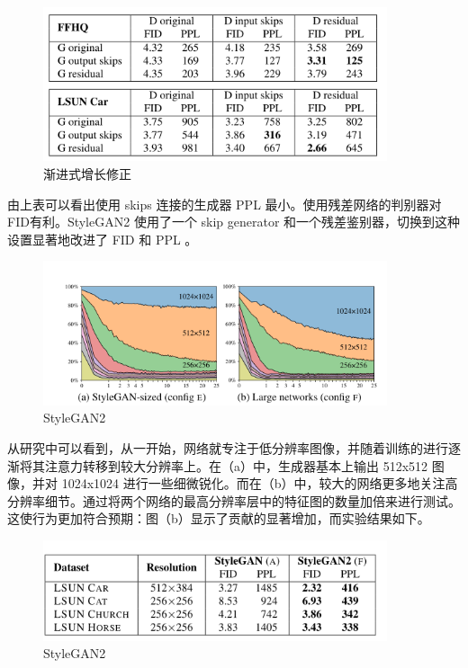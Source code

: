 \begin{figure}[htb]
\centering 
\includegraphics[width=0.9\textwidth]{img/m2t17.png} 
\caption{渐进式增长修正}
\label{Test}
\end{figure}

由上表可以看出使用 skips 连接的生成器 PPL 最小。使用残差网络的判别器对FID有利。StyleGAN2 使用了一个 skip generator 和一个残差鉴别器，切换到这种设置显著地改进了 FID 和 PPL 。

\begin{figure}[htb]
\centering 
\includegraphics[width=0.9\textwidth]{img/m2t18.png} 
\caption{StyleGAN2}
\label{Test}
\end{figure}

从研究中可以看到，从一开始，网络就专注于低分辨率图像，并随着训练的进行逐渐将其注意力转移到较大分辨率上。在（a）中，生成器基本上输出 512x512 图像，并对 1024x1024 进行一些细微锐化。而在（b）中，较大的网络更多地关注高分辨率细节。通过将两个网络的最高分辨率层中的特征图的数量加倍来进行测试。这使行为更加符合预期：图（b）显示了贡献的显著增加，而实验结果如下。

\begin{figure}[htb]
\centering 
\includegraphics[width=0.9\textwidth]{img/m2t19.png} 
\caption{StyleGAN2}
\label{Test}
\end{figure}

